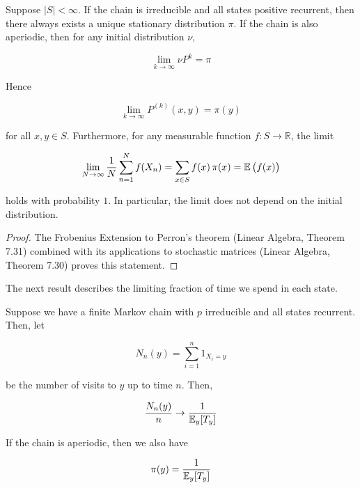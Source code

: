 	\begin{theorem}
		\label{thm:stationary-distribution-for-a-finite}
		Suppose $|S| < \infty$. If the chain is irreducible and all states positive recurrent, then there always exists a unique stationary distribution $\pi$. If the chain is also aperiodic, then for any initial distribution $\nu$, 

			\begin{equation}
				\lim_{k \rightarrow \infty} \nu P^k = \pi
			\end{equation}

		Hence

			\begin{equation}
				\lim_{k \rightarrow \infty} P^{(k)}(x, y) = \pi(y)
			\end{equation}

		for all $x, y \in S$. Furthermore, for any measurable function $f: S \to \mathbb{R}$, the limit 

			\begin{equation}
				\lim_{N \rightarrow \infty} \frac{1}{N} \sum_{n=1}^N f(X_n) = \sum_{x \in S} f(x)\, \pi(x) = \operatorname{\mathbb{E}} \big( f(x) \big)
			\end{equation}

		holds with probability $1$. In particular, the limit does not depend on the initial distribution. 
	\end{theorem}
	\begin{proof}
		The Frobenius Extension to Perron's theorem (Linear Algebra, Theorem 7.31) combined with its applications to stochastic matrices (Linear Algebra, Theorem 7.30) proves this statement. 
	\end{proof}

	The next result describes the limiting fraction of time we spend in each state. 

	\begin{theorem}
		\label{thm:asymptotic-frequency}
		Suppose we have a finite Markov chain with $p$ irreducible and all states recurrent. Then, let 

			\begin{equation}
				N_n (y) = \sum_{i=1}^n 1_{X_i = y}
			\end{equation}

		be the number of visits to $y$ up to time $n$. Then, 

			\begin{equation}
				\frac{N_n (y)}{n} \rightarrow \frac{1}{\operatorname{\mathbb{E}}_y [T_y]}
			\end{equation}

		If the chain is aperiodic, then we also have 

			\begin{equation}
				\pi(y) = \frac{1}{\operatorname{\mathbb{E}}_y [T_y]}
			\end{equation}
	\end{theorem}

